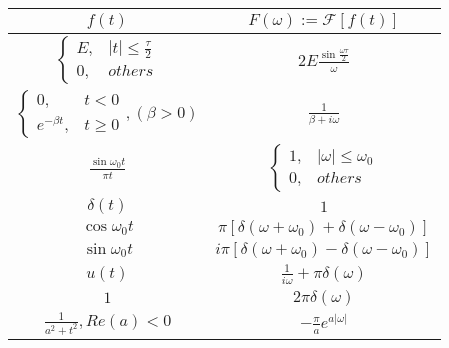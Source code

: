 \documentclass[UTF8, 12pt]{ctexart}
\begin{document}
	\begin{table}[ht]
		\begin{tabular}{|c|c|}
			\hline
			$ f(t)$ & $ F(\omega) := \mathscr{F}[f(t)]$ \\ \hline
			$ \begin{cases} E,& |t| \leq \frac{\tau}{2} \\ 0,& others \end{cases} $ & $ 2E\frac{\sin\frac{\omega\tau}{2}}{\omega} $ \\ \hline
			$ \begin{cases} 0,& t < 0 \\ e^{-\beta t},& t \geq 0 \end{cases}, (\beta > 0) $ & $ \frac{1}{\beta+i\omega} $ \\ \hline
			$ \frac{\sin\omega_0t}{\pi t} $ & $ \begin{cases} 1,& |\omega| \leq \omega_0 \\ 0,& others \end{cases} $ \\ \hline
			$ \delta(t) $ & $ 1 $ \\ \hline
			$ \cos\omega_0t $ & $ \pi[\delta(\omega+\omega_0) + \delta(\omega-\omega_0)] $ \\ \hline
			$ \sin\omega_0t $ & $ i\pi[\delta(\omega+\omega_0) - \delta(\omega-\omega_0)] $ \\ \hline
			$ u(t) $ & $ \frac{1}{i\omega} + \pi\delta(\omega) $ \\ \hline
			$ 1 $ & $ 2\pi\delta(\omega) $ \\ \hline
			$ \frac{1}{a^{2}+t^{2}}, Re(a) < 0$ & $ -\frac{\pi}{a}e^{a|\omega|} $ \\ \hline
		\end{tabular}
	\end{table}
\end{document}
